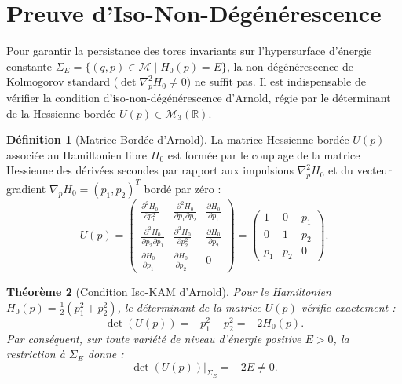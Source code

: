 \documentclass[10pt,twocolumn,a4paper]{article}
\theoremstyle{plain}
\newtheorem{theorem}{Théorème}[section]
\theoremstyle{definition}
\newtheorem{definition}[theorem]{Définition}
\begin{document}
\section{Preuve d'Iso-Non-Dégénérescence}
Pour garantir la persistance des tores invariants sur l'hypersurface d'énergie constante $\Sigma_E = \{(q, p) \in \mathcal{M} \mid H_0(p) = E\}$, la non-dégénérescence de Kolmogorov standard ($\det \nabla_p^2 H_0 \neq 0$) ne suffit pas. Il est indispensable de vérifier la condition d'iso-non-dégénérescence d'Arnold, régie par le déterminant de la Hessienne bordée $U(p) \in \mathcal{M}_3(\mathbb{R})$.

\begin{definition}[Matrice Bordée d'Arnold]
La matrice Hessienne bordée $U(p)$ associée au Hamiltonien libre $H_0$ est formée par le couplage de la matrice Hessienne des dérivées secondes par rapport aux impulsions $\nabla_p^2 H_0$ et du vecteur gradient $\nabla_p H_0 = (p_1, p_2)^T$ bordé par zéro :
\begin{equation}
U(p) = \begin{pmatrix}
\frac{\partial^2 H_0}{\partial p_1^2} & \frac{\partial^2 H_0}{\partial p_1 \partial p_2} & \frac{\partial H_0}{\partial p_1} \\
\frac{\partial^2 H_0}{\partial p_2 \partial p_1} & \frac{\partial^2 H_0}{\partial p_2^2} & \frac{\partial H_0}{\partial p_2} \\
\frac{\partial H_0}{\partial p_1} & \frac{\partial H_0}{\partial p_2} & 0
\end{pmatrix} = \begin{pmatrix}
1 & 0 & p_1 \\
0 & 1 & p_2 \\
p_1 & p_2 & 0
\end{pmatrix}.
\label{eq:matrice_arnold}
\end{equation}
\end{definition}

\begin{theorem}[Condition Iso-KAM d'Arnold]
Pour le Hamiltonien $H_0(p) = \frac{1}{2}(p_1^2 + p_2^2)$, le déterminant de la matrice $U(p)$ vérifie exactement :
\begin{equation}
\det(U(p)) = -p_1^2 - p_2^2 = -2H_0(p).
\label{eq:determinant_arnold}
\end{equation}
Par conséquent, sur toute variété de niveau d'énergie positive $E > 0$, la restriction à $\Sigma_E$ donne :
\begin{equation}
\det(U(p))\Big|_{\Sigma_E} = -2E \neq 0.
\label{eq:det_arnold_non_nul}
\end{equation}
\end{theorem}
\end{document}
